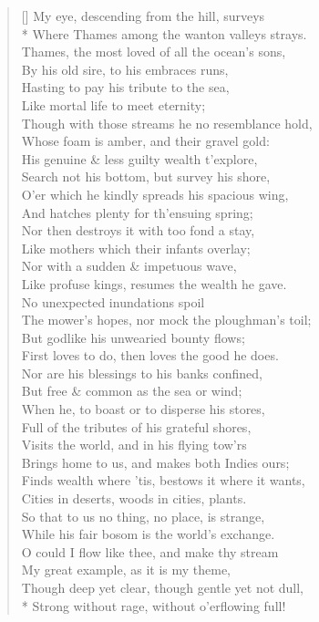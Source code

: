 \documentclass[MAIN]{subfiles}
\begin{document}
\settowidth{\versewidth}{Here lies wise and valiant dust}
\begin{verse}[\versewidth]
My eye, descending from the hill, surveys\\* 
Where {\sc Thames} among the wanton valleys strays.\\
{\sc Thames}, the most loved of all the ocean's sons,\\
By his old sire, to his embraces runs,\\
Hasting to pay his tribute to the sea,\\
Like mortal life to meet eternity;\\
Though with those streams he no resemblance hold,\\
Whose foam is amber, and their gravel gold:\\
His genuine \& less guilty wealth t'explore,\\
Search not his bottom, but survey his shore,\\
O'er which he kindly spreads his spacious wing,\\
And hatches plenty for th'ensuing spring;\\
Nor then destroys it with too fond a stay,\\
Like mothers which their infants overlay;\\
Nor with a sudden \& impetuous wave,\\
Like profuse kings, resumes the wealth he gave.\\
No unexpected inundations spoil\\
The mower's hopes, nor mock the ploughman's toil;\\
But godlike his unwearied bounty flows;\\
First loves to do, then loves the good he does.\\
Nor are his blessings to his banks confined,\\
But free \& common as the sea or wind;\\
When he, to boast or to disperse his stores,\\
Full of the tributes of his grateful shores,\\
Visits the world, and in his flying tow'rs\\
Brings home to us, and makes both Indies ours;\\
Finds wealth where 'tis, bestows it where it wants,\\
Cities in deserts, woods in cities, plants.\\
So that to us no thing, no place, is strange,\\
While his fair bosom is the world's exchange.\\
O could I flow like thee, and make thy stream\\
My great example, as it is my theme,\\
Though deep yet clear, though gentle yet not dull,\\*
Strong without rage, without o'erflowing full!
\end{verse}
\end{document}
